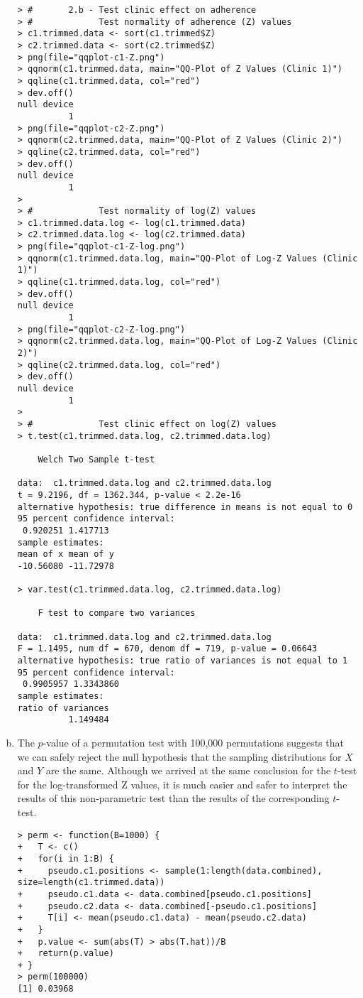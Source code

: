 \documentclass[a4paper, 10pt]{article}
\begin{document}
\begin{enumerate}[(a)]
{\scriptsize \begin{verbatim}
> #       2.b - Test clinic effect on adherence
> #             Test normality of adherence (Z) values
> c1.trimmed.data <- sort(c1.trimmed$Z)
> c2.trimmed.data <- sort(c2.trimmed$Z)
> png(file="qqplot-c1-Z.png")
> qqnorm(c1.trimmed.data, main="QQ-Plot of Z Values (Clinic 1)")
> qqline(c1.trimmed.data, col="red")
> dev.off()
null device 
          1 
> png(file="qqplot-c2-Z.png")
> qqnorm(c2.trimmed.data, main="QQ-Plot of Z Values (Clinic 2)")
> qqline(c2.trimmed.data, col="red")
> dev.off()
null device 
          1 
> 
> #             Test normality of log(Z) values
> c1.trimmed.data.log <- log(c1.trimmed.data)
> c2.trimmed.data.log <- log(c2.trimmed.data)
> png(file="qqplot-c1-Z-log.png")
> qqnorm(c1.trimmed.data.log, main="QQ-Plot of Log-Z Values (Clinic 1)")
> qqline(c1.trimmed.data.log, col="red")
> dev.off()
null device 
          1 
> png(file="qqplot-c2-Z-log.png")
> qqnorm(c2.trimmed.data.log, main="QQ-Plot of Log-Z Values (Clinic 2)")
> qqline(c2.trimmed.data.log, col="red")
> dev.off()
null device 
          1 
> 
> #             Test clinic effect on log(Z) values
> t.test(c1.trimmed.data.log, c2.trimmed.data.log)

	Welch Two Sample t-test

data:  c1.trimmed.data.log and c2.trimmed.data.log 
t = 9.2196, df = 1362.344, p-value < 2.2e-16
alternative hypothesis: true difference in means is not equal to 0 
95 percent confidence interval:
 0.920251 1.417713 
sample estimates:
mean of x mean of y 
-10.56080 -11.72978

> var.test(c1.trimmed.data.log, c2.trimmed.data.log)

	F test to compare two variances

data:  c1.trimmed.data.log and c2.trimmed.data.log 
F = 1.1495, num df = 670, denom df = 719, p-value = 0.06643
alternative hypothesis: true ratio of variances is not equal to 1 
95 percent confidence interval:
 0.9905957 1.3343860 
sample estimates:
ratio of variances 
          1.149484
\end{verbatim} }

\item The $p$-value of a permutation test with 100,000 permutations suggests that we can safely reject the null hypothesis that the sampling distributions for $X$ and $Y$ are the same. Although we arrived at the same conclusion for the $t$-test for the log-transformed Z values, it is much easier and safer to interpret the results of this non-parametric test than the results of the corresponding $t$-test.

{\scriptsize \begin{verbatim}
> perm <- function(B=1000) {
+   T <- c()
+   for(i in 1:B) {
+     pseudo.c1.positions <- sample(1:length(data.combined), size=length(c1.trimmed.data))
+     pseudo.c1.data <- data.combined[pseudo.c1.positions]
+     pseudo.c2.data <- data.combined[-pseudo.c1.positions]
+     T[i] <- mean(pseudo.c1.data) - mean(pseudo.c2.data)
+   }
+   p.value <- sum(abs(T) > abs(T.hat))/B
+   return(p.value)
+ }
> perm(100000)
[1] 0.03968
\end{verbatim} }
\end{enumerate}
\end{document}
